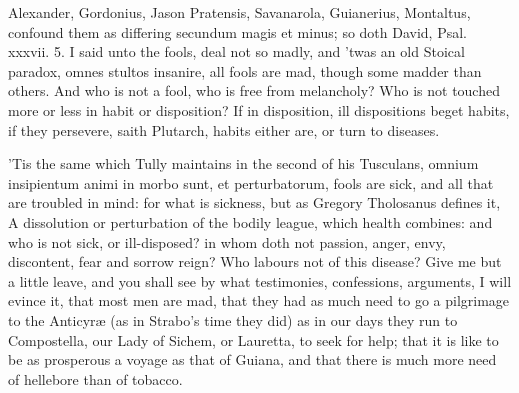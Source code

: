 {Alexander, Gordonius, Jason Pratensis, Savanarola, Guianerius,
Montaltus, confound them as differing secundum magis et minus; so doth
David, Psal. xxxvii. 5. I said unto the fools, deal not so madly, and
'twas an old Stoical paradox, omnes stultos insanire, all fools
are mad, though some madder than others. And who is not a fool, who is
free from melancholy? Who is not touched more or less in habit or
disposition? If in disposition, ill dispositions beget habits, if they
persevere, saith Plutarch, habits either are, or turn to diseases.

'Tis the same which Tully maintains in the second of his Tusculans,
omnium insipientum animi in morbo sunt, et perturbatorum, fools are
sick, and all that are troubled in mind: for what is sickness, but as
Gregory Tholosanus defines it, A dissolution or perturbation of
the bodily league, which health combines: and who is not sick, or
ill-disposed? in whom doth not passion, anger, envy, discontent, fear
and sorrow reign? Who labours not of this disease? Give me but a little
leave, and you shall see by what testimonies, confessions, arguments, I
will evince it, that most men are mad, that they had as much need to go
a pilgrimage to the Anticyr\ae{} (as in Strabo's time they did) as in
our days they run to Compostella, our Lady of Sichem, or Lauretta, to
seek for help; that it is like to be as prosperous a voyage as that of
Guiana, and that there is much more need of hellebore than of tobacco.

}
